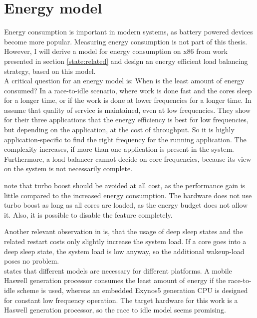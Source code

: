 \section{Energy model}
\label{design:energy}

Energy consumption is important in modern systems, as battery powered devices
become more popular.
Measuring energy consumption is not part of this thesis.
However, I will derive a model for energy consumption on x86 from work presented
in section \ref{state:related} and design an energy efficient load balancing
strategy, based on this model.
\\

A critical question for an energy model is:
When is the least amount of energy consumed?
In a race-to-idle scenario, where work is done fast and the cores sleep for a
longer time, or if the work is done at lower frequencies for a longer time.
In \cite{le_sueur_slow_2011} \citeauthor{le_sueur_slow_2011} assume that
quality of service is maintained, even at low frequencies.
They show for their three applications that the
energy efficiency is best for low frequencies, but depending on the
application, at the cost of throughput.
So it is highly application-specific to find the right frequency for the
running application.
The complexity increases, if more than one application is present in the
system.
Furthermore, a load balancer cannot decide on core frequencies, because its
view on the system is not necessarily complete.

\citeauthor{le_sueur_slow_2011} note that turbo boost should be avoided at
all cost, as the performance gain is little compared to the increased energy
consumption.
The hardware does not use turbo boost as long as all cores are loaded, as the
energy budget does not allow it.
Also, it is possible to disable the feature completely.


Another relevant observation in \cite{le_sueur_slow_2011} is, that the usage
of deep sleep states and the related restart costs only slightly increase the
system load.
If a core goes into a deep sleep state, the system load is low anyway, so the
additional wakeup-load poses no problem.
\\

\cite{imes_poet_2015} states that different models are necessary for different
platforms.
A mobile Haswell generation processor consumes the least amount of energy if
the race-to-idle scheme is used, whereas an embedded Exynos5 generation CPU is
designed for constant low frequency operation.
The target hardware for this work is a Haswell generation processor, so the
race to idle model seems promising.
\\

